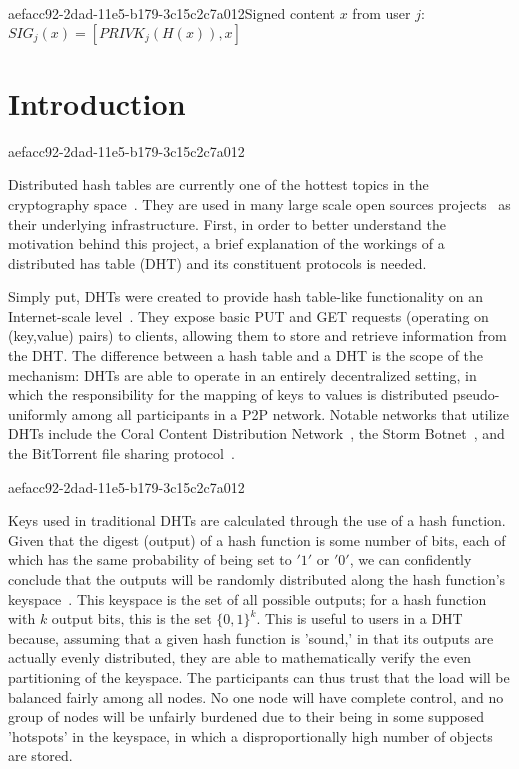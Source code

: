 \documentclass[12pt]{article}
\begin{document}
aefacc92-2dad-11e5-b179-3c15c2c7a012Signed content $x$ from user $j$: $SIG_j(x) = \left[ PRIVK_j( H(x) ), x \right]$

\section{Introduction}
aefacc92-2dad-11e5-b179-3c15c2c7a012\par Distributed hash tables are currently one of the hottest topics in the cryptography space~\cite{Stoica:2001dj,Rowstron:2001ea,Ratnasamy:2001wn}. They are used in many large scale open sources projects~\cite{Freitas:2013tb,Xu:2010vs,Perfitt:2010fh} as their underlying infrastructure. First, in order to better understand the motivation behind this project, a brief explanation of the workings of a distributed has table (DHT) and its constituent protocols is needed.

\par Simply put, DHTs were created to provide hash table-like functionality on an Internet-scale level~\cite{Ratnasamy:2001wn}. They expose basic PUT and GET requests (operating on (key,value) pairs) to clients, allowing them to store and retrieve information from the DHT. The difference between a hash table and a DHT is the scope of the mechanism: DHTs are able to operate in an entirely decentralized setting, in which the responsibility for the mapping of keys to values is distributed pseudo-uniformly among all participants in a P2P network. Notable networks that utilize DHTs include the Coral Content Distribution Network~\cite{Freedman:2004vb}, the Storm Botnet~\cite{Holz:2008uk}, and the BitTorrent file sharing protocol~\cite{Cohen:y1_8mBnw}.

aefacc92-2dad-11e5-b179-3c15c2c7a012\par Keys used in traditional DHTs are calculated through the use of a hash function. Given that the digest (output) of a hash function is some number of bits, each of which has the same probability of being set to $'1'$ or $'0'$, we can confidently conclude that the outputs will be randomly distributed along the hash function's keyspace~. This keyspace is the set of all possible outputs; for a hash function with $k$ output bits, this is the set $\{0,1\}^k$. This is useful to users in a DHT because, assuming that a given hash function is 'sound,' in that its outputs are actually evenly distributed, they are able to mathematically verify the even partitioning of the keyspace. The participants can thus trust that the load will be balanced fairly among all nodes. No one node will have complete control, and no group of nodes will be unfairly burdened due to their being in some supposed 'hotspots' in the keyspace, in which a disproportionally high number of objects are stored.~
\end{document}
